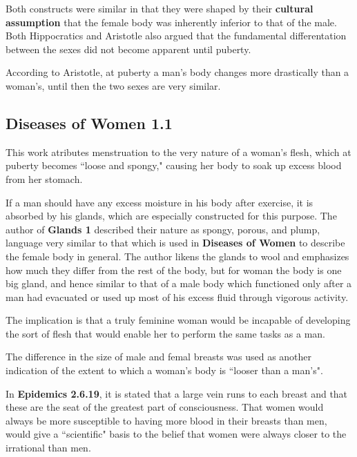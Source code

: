 Both constructs were similar in that they were shaped by their \textbf{cultural assumption} that the female body was inherently inferior to that of the male. Both Hippocratics and Aristotle also argued that the fundamental differentation between the sexes did not become apparent until puberty.

\begin{nte}
    According to Aristotle, at puberty a man's body changes more drastically than a woman's, until then the two sexes are very similar.
\end{nte}


\subsection{Diseases of Women 1.1}

This work atributes menstruation to the very nature of a woman's flesh, which at puberty becomes ``loose and spongy," causing her body to soak up excess blood from her stomach.

If a man should have any excess moisture in his body after exercise, it is absorbed by his glands, which are especially constructed for this purpose. The author of \textbf{Glands 1} described their nature as spongy, porous, and plump, language very similar to that which is used in \textbf{Diseases of Women} to describe the female body in general. The author likens the glands to wool and emphasizes how much they differ from the rest of the body, but for woman the body is one big gland, and hence similar to that of a male body which functioned only after a man had evacuated or used up most of his excess fluid through vigorous activity.

\begin{rmk}
    The implication is that a truly feminine woman would be incapable of developing the sort of flesh that would enable her to perform the same tasks as a man.
\end{rmk}

The difference in the size of male and femal breasts was used as another indication of the extent to which a woman's body is ``looser than a man's". 

In \textbf{Epidemics 2.6.19}, it is stated that a large vein runs to each breast and that these are the seat of the greatest part of consciousness. That women would always be more susceptible to having more blood in their breasts than men, would give a ``scientific" basis to the belief that women were always closer to the irrational than men.

